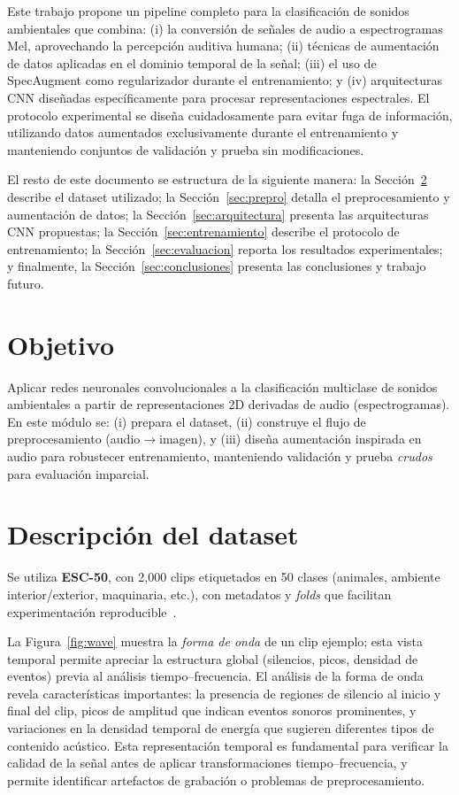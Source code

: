 \documentclass[conference]{IEEEtran}
\begin{document}
Este trabajo propone un pipeline completo para la clasificación de sonidos ambientales que combina: (i) la conversión de señales de audio a espectrogramas Mel, aprovechando la percepción auditiva humana; (ii) técnicas de aumentación de datos aplicadas en el dominio temporal de la señal; (iii) el uso de SpecAugment como regularizador durante el entrenamiento; y (iv) arquitecturas CNN diseñadas específicamente para procesar representaciones espectrales. El protocolo experimental se diseña cuidadosamente para evitar fuga de información, utilizando datos aumentados exclusivamente durante el entrenamiento y manteniendo conjuntos de validación y prueba sin modificaciones.

El resto de este documento se estructura de la siguiente manera: la Sección~\ref{sec:dataset} describe el dataset utilizado; la Sección~\ref{sec:prepro} detalla el preprocesamiento y aumentación de datos; la Sección~\ref{sec:arquitectura} presenta las arquitecturas CNN propuestas; la Sección~\ref{sec:entrenamiento} describe el protocolo de entrenamiento; la Sección~\ref{sec:evaluacion} reporta los resultados experimentales; y finalmente, la Sección~\ref{sec:conclusiones} presenta las conclusiones y trabajo futuro.

\section{Objetivo}
\label{sec:objetivo}
Aplicar redes neuronales convolucionales a la clasificación multiclase de sonidos ambientales a partir de representaciones 2D derivadas de audio (espectrogramas). En este módulo se: (i) prepara el dataset, (ii) construye el flujo de preprocesamiento (audio$\rightarrow$imagen), y (iii) diseña aumentación inspirada en audio para robustecer entrenamiento, manteniendo validación y prueba \emph{crudos} para evaluación imparcial.

\section{Descripción del dataset}
\label{sec:dataset}
Se utiliza \textbf{ESC-50}, con 2{,}000 clips etiquetados en 50 clases (animales, ambiente interior/exterior, maquinaria, etc.), con metadatos y \emph{folds} que facilitan experimentación reproducible~\cite{piczak2015esc}. 

La Figura~\ref{fig:wave} muestra la \emph{forma de onda} de un clip ejemplo; esta vista temporal permite apreciar la estructura global (silencios, picos, densidad de eventos) previa al análisis tiempo--frecuencia. El análisis de la forma de onda revela características importantes: la presencia de regiones de silencio al inicio y final del clip, picos de amplitud que indican eventos sonoros prominentes, y variaciones en la densidad temporal de energía que sugieren diferentes tipos de contenido acústico. Esta representación temporal es fundamental para verificar la calidad de la señal antes de aplicar transformaciones tiempo--frecuencia, y permite identificar artefactos de grabación o problemas de preprocesamiento.
\end{document}
